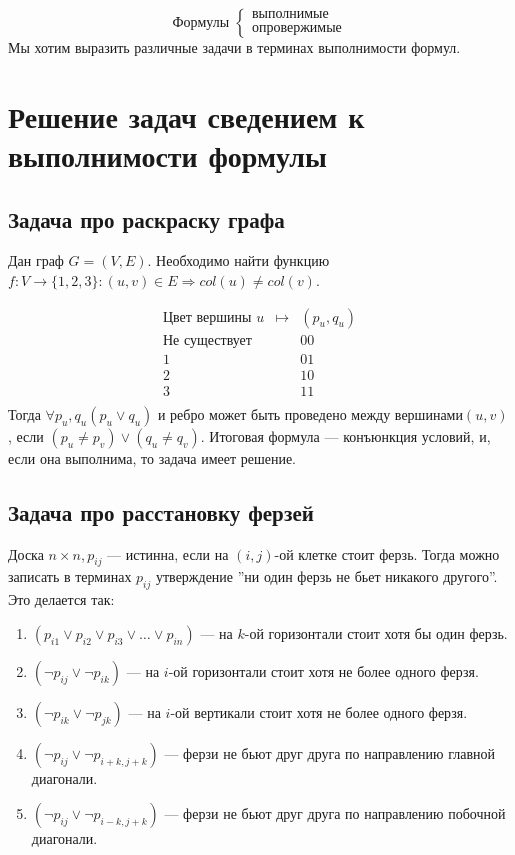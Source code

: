 
$$\text{Формулы }\left\{\begin{array}{l}
    \text{выполнимые}  \\
    \text{опровержимые}
\end{array}\right.$$
Мы хотим выразить различные задачи в терминах выполнимости формул.

\section{Решение задач сведением к выполнимости формулы}
\subsection{Задача про раскраску графа}
Дан граф $G = (V, E)$. Необходимо найти функцию $f: V \rightarrow \{1, 2, 3\}: (u, v) \in E \Rightarrow col(u) \ne col(v)$.

$$\begin{array}{ccc}
    \text{Цвет вершины $u$} & \mapsto & (p_u, q_u) \\
    \hline
    \text{Не существует} & & 00 \\
    1 & & 01 \\
    2 & & 10 \\
    3 & & 11 \\
\end{array}$$
Тогда $\forall p_u, q_u (p_u \vee q_u)$ и ребро может быть проведено между вершинами$(u, v)$, если $(p_u \ne p_v) \vee (q_u \ne q_v)$. Итоговая формула --- конъюнкция условий, и, если она выполнима, то задача имеет решение.

\subsection{Задача про расстановку ферзей}
Доска $n\times n, p_{ij}$ --- истинна, если на $(i, j)$-ой клетке стоит ферзь. Тогда можно записать в терминах $p_{ij}$ утверждение ''ни один ферзь не бьет никакого другого''. Это делается так:
\begin{enumerate}
    \item $(p_{i1} \vee p_{i2} \vee p_{i3} \vee \dots \vee p_{in})$ --- на $k$-ой горизонтали стоит хотя бы один ферзь.
    \item $(\neg p_{ij} \vee \neg p_{ik})$ --- на $i$-ой горизонтали стоит хотя не более одного ферзя.
    \item $(\neg p_{ik} \vee \neg p_{jk})$ --- на $i$-ой вертикали стоит хотя не более одного ферзя.
    \item $(\neg p_{ij} \vee \neg p_{i+k, j+k})$ --- ферзи не бьют друг друга по направлению главной диагонали.
    \item $(\neg p_{ij} \vee \neg p_{i-k, j+k})$ --- ферзи не бьют друг друга по направлению побочной диагонали.
\end{enumerate}

